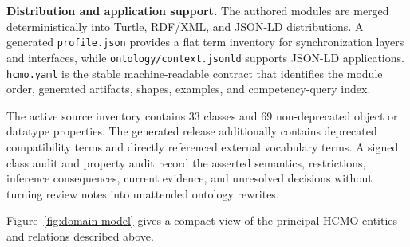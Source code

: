 

\textbf{Distribution and application support.} The authored modules are merged deterministically into Turtle, RDF/XML, and JSON-LD distributions. A generated \nolinkurl{profile.json} provides a flat term inventory for synchronization layers and interfaces, while \nolinkurl{ontology/context.jsonld} supports JSON-LD applications. \nolinkurl{hcmo.yaml} is the stable machine-readable contract that identifies the module order, generated artifacts, shapes, examples, and competency-query index.

The active source inventory contains 33 classes and 69 non-deprecated object or datatype properties. The generated release additionally contains deprecated compatibility terms and directly referenced external vocabulary terms. A signed class audit and property audit record the asserted semantics, restrictions, inference consequences, current evidence, and unresolved decisions without turning review notes into unattended ontology rewrites.

Figure~\ref{fig:domain-model} gives a compact view of the principal HCMO entities and relations described above.


